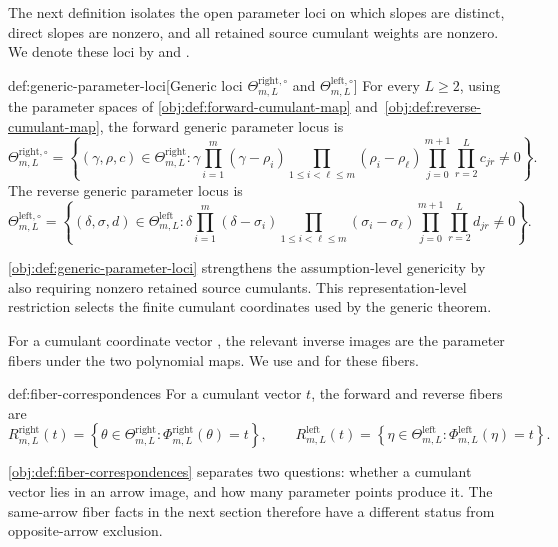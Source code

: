 The next definition isolates the open parameter loci on which slopes are distinct, direct slopes are nonzero, and all retained source cumulant weights are nonzero. We denote these loci by  and .

\begin{definitionv}{def:generic-parameter-loci}[Generic loci \(\Theta^{\mathrm{right},\circ}_{m,L}\) and \(\Theta^{\mathrm{left},\circ}_{m,L}\)]
For every \(L\ge2\), using the parameter spaces of \cref{obj:def:forward-cumulant-map} and~\cref{obj:def:reverse-cumulant-map}, the forward generic parameter locus is
\[
\Theta^{\mathrm{right},\circ}_{m,L}
=
\left\{
(\gamma,\rho,c)\in \Theta^{\mathrm{right}}_{m,L}:
\gamma
\prod_{i=1}^m(\gamma-\rho_i)
\prod_{1\le i<\ell\le m}(\rho_i-\rho_\ell)
\prod_{j=0}^{m+1}\prod_{r=2}^L c_{jr}
\ne 0
\right\}.
\]
The reverse generic parameter locus is
\[
\Theta^{\mathrm{left},\circ}_{m,L}
=
\left\{
(\delta,\sigma,d)\in \Theta^{\mathrm{left}}_{m,L}:
\delta
\prod_{i=1}^m(\delta-\sigma_i)
\prod_{1\le i<\ell\le m}(\sigma_i-\sigma_\ell)
\prod_{j=0}^{m+1}\prod_{r=2}^L d_{jr}
\ne 0
\right\}.
\]
\end{definitionv}

\cref{obj:def:generic-parameter-loci} strengthens the assumption-level genericity by also requiring nonzero retained source cumulants. This representation-level restriction selects the finite cumulant coordinates used by the generic theorem.

For a cumulant coordinate vector , the relevant inverse images are the parameter fibers under the two polynomial maps. We use  and  for these fibers.

\begin{definitionv}{def:fiber-correspondences}
For a cumulant vector \(t\), the forward and reverse fibers are
\[
R^{\mathrm{right}}_{m,L}(t)
=
\left\{
\theta\in \Theta^{\mathrm{right}}_{m,L}:
\Phi^{\mathrm{right}}_{m,L}(\theta)=t
\right\},
\qquad
R^{\mathrm{left}}_{m,L}(t)
=
\left\{
\eta\in \Theta^{\mathrm{left}}_{m,L}:
\Phi^{\mathrm{left}}_{m,L}(\eta)=t
\right\}.
\]
\end{definitionv}

\cref{obj:def:fiber-correspondences} separates two questions: whether a cumulant vector lies in an arrow image, and how many parameter points produce it. The same-arrow fiber facts in the next section therefore have a different status from opposite-arrow exclusion.

